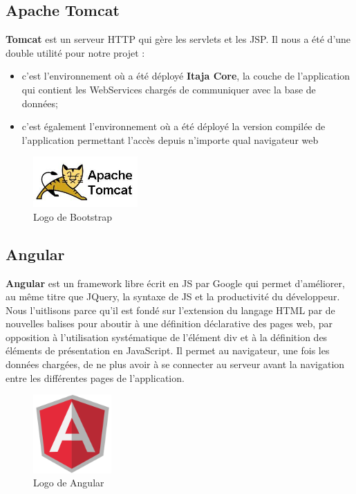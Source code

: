 \documentclass[12pt]{report}
\begin{document}
	\subsection{Apache Tomcat}
	  \textbf{Tomcat} est un serveur HTTP qui gère les servlets et les \gls{JSP}. Il nous a été d'une double utilité pour notre projet :
	  \begin{itemize}
	    \item c'est l'environnement où a été déployé \textbf{Itaja Core}, la couche de l'application qui contient les WebServices chargés de communiquer avec la base de données;
	    \item c'est également l'environnement où a été déployé la version compilée de l'application permettant l'accès depuis n'importe qual navigateur web
	  \end{itemize}
	  
	   \begin{figure}[H]
	      \begin{center}
		\includegraphics[scale=0.6, width=4cm]{images/logoApacheTomcat.jpg}
		\caption{Logo de Bootstrap}
	      \end{center}
	    \end{figure}
	  
	\subsection{Angular}
	  \textbf{Angular} est un framework libre écrit en \gls{JS} par Google qui permet d'améliorer, au même titre que JQuery, la syntaxe de \gls{JS} et la productivité du développeur. Nous l'uitlisons parce qu'il est fondé sur l’extension du langage HTML par de nouvelles balises pour aboutir à une définition déclarative des pages web, par opposition à l’utilisation systématique de l’élément div​ et à la définition des éléments de présentation en JavaScript. Il permet au navigateur, une fois les données chargées, de ne plus avoir à se connecter au serveur avant la navigation entre les différentes pages de l'application.
	  
	  \begin{figure}[H]
	    \begin{center}
	      \includegraphics[scale=0.6, width=3cm]{images/logoAngular.png}
	      \caption{Logo de Angular}
	    \end{center}
	  \end{figure}
	  
\end{document}
